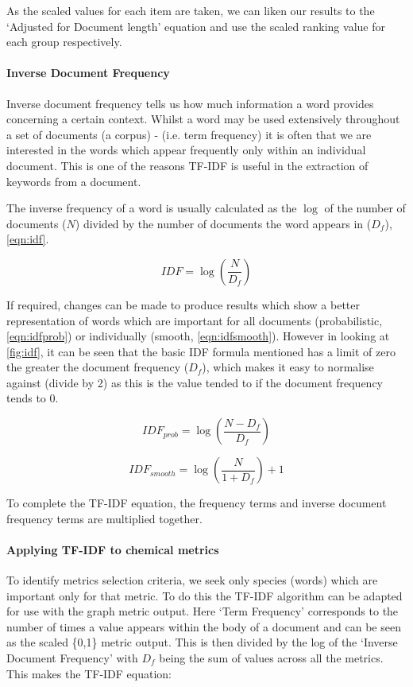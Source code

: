 As the scaled values for each item are taken, we can liken our results to the `Adjusted for Document length' equation and use the scaled ranking value for each group respectively.

\paragraph*{Inverse Document Frequency}
Inverse document frequency tells us how much information a word provides concerning a certain context. Whilst a word may be used extensively throughout a set of documents (a corpus) -  (i.e. term frequency) it is often that we are interested in the words which appear frequently only within an individual document. This is one of the reasons TF-IDF is useful in the extraction of keywords from a document. 

The inverse frequency of a word is usually calculated as the $\log$ of the number of documents ($N$) divided by the number of documents the word appears in ($D_f$), \autoref{eqn:idf}.


\begin{equation}
    IDF = \log(\frac{N}{D_f})
    \label{eqn:idf}
\end{equation}

If required, changes can be made to produce results which show a better representation of words which are important for all documents (probabilistic, \autoref{eqn:idfprob}) or individually (smooth, \autoref{eqn:idfsmooth}). However in looking at \autoref{fig:idf}, it can be seen that the basic IDF formula mentioned has a limit of zero the greater the document frequency ($D_f$), which makes it easy to normalise against (divide by 2) as this is the value tended to if the document frequency tends to 0.    


\begin{equation}
    IDF_{prob} = \log(\frac{N-D_f}{D_f})
    \label{eqn:idfprob}
\end{equation}

\begin{equation}
    IDF_{smooth} = \log(\frac{N}{1+D_f})+1
    \label{eqn:idfsmooth}
\end{equation}




To complete the TF-IDF equation, the frequency terms and inverse document frequency terms are multiplied together. 

\paragraph*{Applying TF-IDF to chemical metrics}
To identify metrics selection criteria, we seek only species (words) which are important only for that metric. To do this the TF-IDF algorithm can be adapted for use with the graph metric output. Here `Term Frequency' corresponds to the number of times a value appears within the body of a document and can be seen as the scaled \{0,1\} metric output. This is then divided by the log of the `Inverse Document Frequency' with $D_f$ being the sum of values across all the metrics. This makes the TF-IDF equation: 


